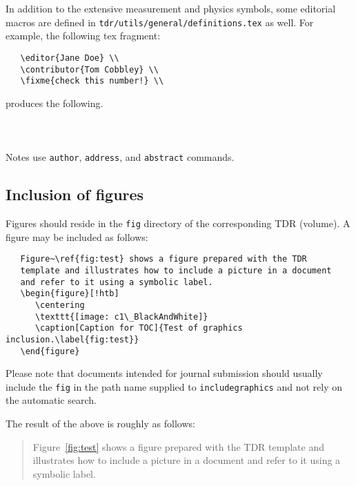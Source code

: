 In addition to the extensive measurement and physics symbols,
some editorial macros are defined in
\texttt{tdr/utils/general/definitions.tex} as well.
For example, the following tex fragment:
\begin{verbatim}
   \editor{Jane Doe} \\
   \contributor{Tom Cobbley} \\
   \fixme{check this number!} \\
\end{verbatim}
%
produces the following. \\
\bigbreak
{}\mbox{~}\\
\mbox{~} \\
\mbox{~}\\

Notes use \texttt{author}, \texttt{address}, and \texttt{abstract} commands.



\subsection{Inclusion of figures}

Figures should reside in the \texttt{fig} directory of the corresponding TDR (volume).
A figure may be included as follows:
%
\begin{verbatim}
   Figure~\ref{fig:test} shows a figure prepared with the TDR
   template and illustrates how to include a picture in a document
   and refer to it using a symbolic label.
   \begin{figure}[!htb]
      \centering
      \texttt{[image: c1\_BlackAndWhite]}
      \caption[Caption for TOC]{Test of graphics inclusion.\label{fig:test}}
   \end{figure}
\end{verbatim}
%
Please note that documents intended for journal submission should usually include the \texttt{fig} in the path name supplied to \texttt{includegraphics} and not rely on the automatic search.

The result of the above is roughly as follows:
%

\begin{quote}
Figure~\ref{fig:test} shows a figure prepared with the TDR
    template and illustrates how to include
a picture in a document and refer to it using a symbolic label.
\end{quote}

